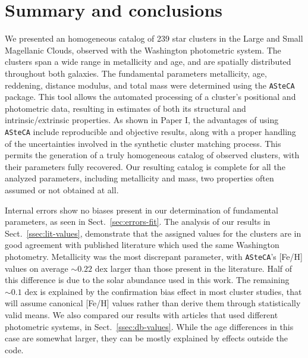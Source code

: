 \documentclass{aa}
\begin{document}

\section{Summary and conclusions}
\label{sec:summ-concl}

We presented an homogeneous catalog of 239 star clusters in the Large and Small
Magellanic Clouds, observed with the Washington photometric system. The clusters
span a wide range in metallicity and age, and are spatially distributed
throughout both galaxies.
%
The fundamental parameters metallicity, age, reddening, distance modulus, and
total mass were determined using the \texttt{ASteCA} package.
%
This tool allows the automated processing of a cluster's positional and
photometric data, resulting in estimates of both its structural and
intrinsic/extrinsic properties.
%
As shown in Paper I, the advantages of using \texttt{ASteCA} include
reproducible and objective results, along with a proper handling of the
uncertainties involved in the synthetic cluster matching process.
%
This permits the generation of a truly homogeneous catalog of observed
clusters, with their parameters fully recovered.
%
Our resulting catalog is complete for all the analyzed parameters, including
metallicity and mass, two properties often assumed or not obtained at all.

Internal errors show no biases present in our determination of fundamental
parameters, as seen in Sect.~\ref{sec:errors-fit}.
%
The analysis of our results in Sect.~\ref{ssec:lit-values}, demonstrate that the
assigned values for the clusters are in good agreement with published literature
which used the same Washington photometry.
%
Metallicity was the most discrepant parameter, with \texttt{ASteCA}'s
[Fe/H] values on average ${\sim}0.22$ dex larger than those present in the
literature. Half of this difference is due to the solar abundance used in
this work. The remaining ${\sim}0.1$ dex is explained by the confirmation
bias effect in most cluster studies, that will assume canonical [Fe/H]
values rather than derive them through statistically valid means.
%
We also compared our results with articles that used different photometric
systems, in Sect.~\ref{ssec:db-values}. While the age differences in
this case are somewhat larger, they can be mostly explained by effects outside
the code.
\end{document}

